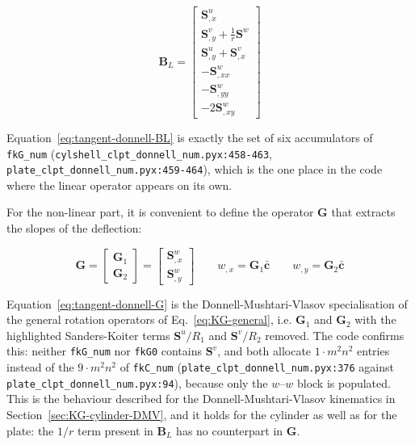 \begin{equation}\label{eq:tangent-donnell-BL}
	\boldsymbol{B}_L = \begin{bmatrix}
		\boldsymbol{S}^u_{,x} \\
		\boldsymbol{S}^v_{,y} + \frac{1}{r}\boldsymbol{S}^w \\
		\boldsymbol{S}^u_{,y} + \boldsymbol{S}^v_{,x} \\
		-\boldsymbol{S}^w_{,xx} \\
		-\boldsymbol{S}^w_{,yy} \\
		-2\boldsymbol{S}^w_{,xy}
	\end{bmatrix}
\end{equation}

Equation~\ref{eq:tangent-donnell-BL} is exactly the set of six accumulators of \texttt{fkG\_num} (\texttt{cylshell\_clpt\_donnell\_num.pyx:458-463}, \texttt{plate\_clpt\_donnell\_num.pyx:459-464}), which is the one place in the code where the linear operator appears on its own.

For the non-linear part, it is convenient to define the operator $\boldsymbol{G}$ that extracts the slopes of the deflection:

\begin{equation}\label{eq:tangent-donnell-G}
	\boldsymbol{G} = \begin{bmatrix} \boldsymbol{G}_1 \\ \boldsymbol{G}_2 \end{bmatrix} = \begin{bmatrix} \boldsymbol{S}^w_{,x} \\ \boldsymbol{S}^w_{,y} \end{bmatrix}
	\qquad
	w_{,x} = \boldsymbol{G}_1 \bar{\boldsymbol{c}}
	\qquad
	w_{,y} = \boldsymbol{G}_2 \bar{\boldsymbol{c}}
\end{equation}

Equation~\ref{eq:tangent-donnell-G} is the Donnell-Mushtari-Vlasov specialisation of the general rotation operators of Eq.~\ref{eq:KG-general}, i.e. $\boldsymbol{G}_1$ and $\boldsymbol{G}_2$ with the highlighted Sanders-Koiter terms $\boldsymbol{S}^u/R_1$ and $\boldsymbol{S}^v/R_2$ removed. The code confirms this: neither \texttt{fkG\_num} nor \texttt{fkG0} contains $\boldsymbol{S}^v$, and both allocate $1 \cdot m^2 n^2$ entries instead of the $9 \cdot m^2 n^2$ of \texttt{fkC\_num} (\texttt{plate\_clpt\_donnell\_num.pyx:376} against \texttt{plate\_clpt\_donnell\_num.pyx:94}), because only the $w$--$w$ block is populated. This is the behaviour described for the Donnell-Mushtari-Vlasov kinematics in Section~\ref{sec:KG-cylinder-DMV}, and it holds for the cylinder as well as for the plate: the $1/r$ term present in $\boldsymbol{B}_L$ has no counterpart in $\boldsymbol{G}$.

